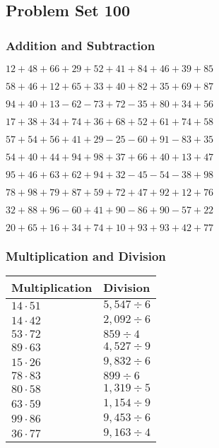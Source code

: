 \hypertarget{problem-set-100}{%
\subsection{Problem Set 100}\label{problem-set-100}}

\hypertarget{addition-and-subtraction}{%
\subsubsection{Addition and
Subtraction}\label{addition-and-subtraction}}

\(12+48+66+29+52+41+84+46+39+85\)

\(58+46+12+65+33+40+82+35+69+87\)

\(94+40+13-62-73+72-35+80+34+56\)

\(17+38+34+74+36+68+52+61+74+58\)

\(57+54+56+41+29-25-60+91-83+35\)

\(54+40+44+94+98+37+66+40+13+47\)

\(95+46+63+62+94+32-45-54-38+98\)

\(78+98+79+87+59+72+47+92+12+76\)

\(32+88+96-60+41+90-86+90-57+22\)

\(20+65+16+34+74+10+93+93+42+77\)

\hypertarget{multiplication-and-division}{%
\subsubsection{Multiplication and
Division}\label{multiplication-and-division}}

\begin{longtable}[]{@{}ll@{}}
\toprule
Multiplication & Division\tabularnewline
\midrule
\endhead
\(14\cdot51\) & \(5,547÷6\)\tabularnewline
\(14\cdot42\) & \(2,092÷6\)\tabularnewline
\(53\cdot72\) & \(859÷4\)\tabularnewline
\(89\cdot63\) & \(4,527÷9\)\tabularnewline
\(15\cdot26\) & \(9,832÷6\)\tabularnewline
\(78\cdot83\) & \(899÷6\)\tabularnewline
\(80\cdot58\) & \(1,319÷5\)\tabularnewline
\(63\cdot59\) & \(1,154÷9\)\tabularnewline
\(99\cdot86\) & \(9,453÷6\)\tabularnewline
\(36\cdot77\) & \(9,163÷4\)\tabularnewline
\bottomrule
\end{longtable}
